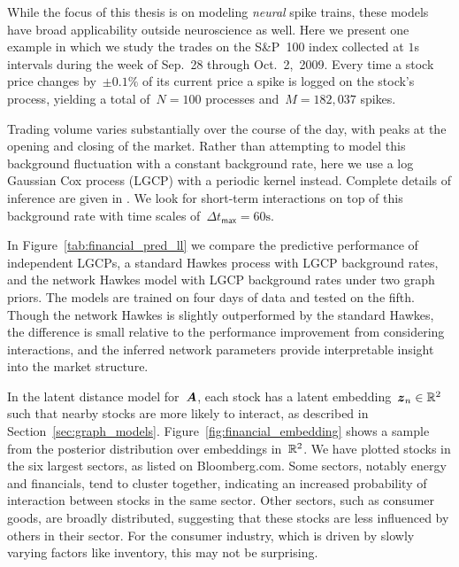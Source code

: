 While the focus of this thesis is on modeling \emph{neural}
spike trains, these models have broad applicability outside neuroscience
as well. Here we present one example in which we study the trades on the
S\&P~100 index collected at $1$s intervals during the week of Sep.~28
through Oct.~2,~2009. Every time a stock price changes by~${\pm0.1\%}$
of its current price a spike is logged on the stock's process,
yielding a total of~${N=100}$ processes and~${M=182,037}$ spikes.

Trading volume varies substantially over the course of the day, with
peaks at the opening and closing of the market. Rather than attempting
to model this background fluctuation with a constant background rate,
here we use a log Gaussian Cox process (LGCP) \citep{Moller-1998} with a periodic kernel
instead. Complete details of inference are given in
\citet{linderman2014discovering}. We look for short-term interactions
on top of this background rate with time scales of~${\Delta
  t_{\textsf{max}}=60\mathrm{s}}$.

In Figure~\ref{tab:financial_pred_ll} we compare the
predictive performance of independent LGCPs, a standard Hawkes process
with LGCP background rates, and the network Hawkes model with LGCP
background rates under two graph priors. The models are trained on
four days of data and tested on the fifth. Though the network Hawkes
is slightly outperformed by the standard Hawkes, the difference is
small relative to the performance improvement from considering
interactions, and the inferred network parameters provide
interpretable insight into the market structure.

In the latent distance model for~$\boldsymbol{A}$, each stock has a latent
embedding~${\boldsymbol{z}_n\in\mathbb{R}^2}$ such that nearby stocks are more likely
to interact, as described in
Section~\ref{sec:graph_models}. Figure~\ref{fig:financial_embedding}
shows a sample from the posterior distribution over embeddings
in~$\mathbb{R}^2$. We have plotted stocks
in the six largest sectors, as listed on Bloomberg.com. Some sectors,
notably energy and financials, tend to cluster together, indicating an
increased probability of interaction between stocks in the same
sector. Other sectors, such as consumer goods, are broadly
distributed, suggesting that these stocks are less influenced by
others in their sector. For the consumer industry, which is driven by
slowly varying factors like inventory, this may not be surprising.


